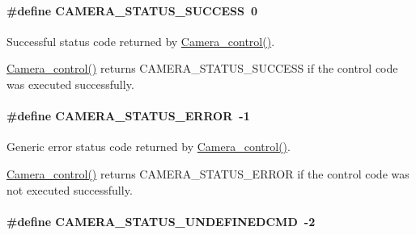 \paragraph[{C\+A\+M\+E\+R\+A\+\_\+\+S\+T\+A\+T\+U\+S\+\_\+\+S\+U\+C\+C\+E\+S\+S}]{\setlength{\rightskip}{0pt plus 5cm}\#define C\+A\+M\+E\+R\+A\+\_\+\+S\+T\+A\+T\+U\+S\+\_\+\+S\+U\+C\+C\+E\+S\+S~0}\label{_camera_8h_aa4d73b4da4ce113c8fb545d1f2649257}


Successful status code returned by \hyperlink{_camera_8h_adfc7e9a60daa499220296a238a09b393}{Camera\+\_\+control()}. 

\hyperlink{_camera_8h_adfc7e9a60daa499220296a238a09b393}{Camera\+\_\+control()} returns C\+A\+M\+E\+R\+A\+\_\+\+S\+T\+A\+T\+U\+S\+\_\+\+S\+U\+C\+C\+E\+S\+S if the control code was executed successfully. 
\paragraph[{C\+A\+M\+E\+R\+A\+\_\+\+S\+T\+A\+T\+U\+S\+\_\+\+E\+R\+R\+O\+R}]{\setlength{\rightskip}{0pt plus 5cm}\#define C\+A\+M\+E\+R\+A\+\_\+\+S\+T\+A\+T\+U\+S\+\_\+\+E\+R\+R\+O\+R~-\/1}\label{_camera_8h_a2863402eca66d26cf447fc02340a0d45}


Generic error status code returned by \hyperlink{_camera_8h_adfc7e9a60daa499220296a238a09b393}{Camera\+\_\+control()}. 

\hyperlink{_camera_8h_adfc7e9a60daa499220296a238a09b393}{Camera\+\_\+control()} returns C\+A\+M\+E\+R\+A\+\_\+\+S\+T\+A\+T\+U\+S\+\_\+\+E\+R\+R\+O\+R if the control code was not executed successfully. 
\paragraph[{C\+A\+M\+E\+R\+A\+\_\+\+S\+T\+A\+T\+U\+S\+\_\+\+U\+N\+D\+E\+F\+I\+N\+E\+D\+C\+M\+D}]{\setlength{\rightskip}{0pt plus 5cm}\#define C\+A\+M\+E\+R\+A\+\_\+\+S\+T\+A\+T\+U\+S\+\_\+\+U\+N\+D\+E\+F\+I\+N\+E\+D\+C\+M\+D~-\/2}\label{_camera_8h_aae8cae4253d68cc8ae921b63a74d1cb9}



